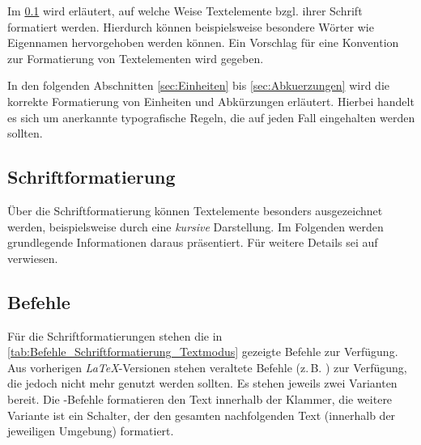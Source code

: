 Im \cref{sec:Schriftformatierung} wird erläutert, auf welche Weise Textelemente bzgl. ihrer Schrift formatiert werden. Hierdurch können beispielsweise besondere Wörter wie Eigennamen hervorgehoben werden können. Ein Vorschlag für eine Konvention zur Formatierung von Textelementen wird gegeben.

In den folgenden Abschnitten \cref{sec:Einheiten} bis \cref{sec:Abkuerzungen} wird die korrekte Formatierung von Einheiten und Abkürzungen erläutert. Hierbei handelt es sich um anerkannte typografische Regeln, die auf jeden Fall eingehalten werden sollten.


\subsection{Schriftformatierung}
\label{sec:Schriftformatierung}

Über die Schriftformatierung können Textelemente besonders ausgezeichnet werden, beispielsweise durch eine \textit{kursive} Darstellung. Im Folgenden werden grundlegende Informationen daraus präsentiert. Für weitere Details sei auf \textcite{fntguide} verwiesen.


\subsection{Befehle}
\label{sec:Befehle}

Für die Schriftformatierungen stehen die in \cref{tab:Befehle_Schriftformatierung_Textmodus} gezeigte Befehle zur Verfügung. Aus vorherigen \textit{\LaTeX{}}-Versionen stehen veraltete Befehle (z.\,B. \command{\bf}) zur Verfügung, die jedoch nicht mehr genutzt werden sollten. Es stehen jeweils zwei Varianten bereit. Die -Befehle formatieren den Text innerhalb der Klammer, die weitere Variante ist ein Schalter, der den gesamten nachfolgenden Text (innerhalb der jeweiligen Umgebung) formatiert.

